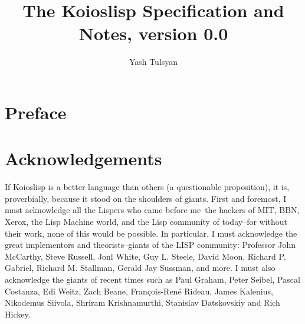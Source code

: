 \documentclass[10pt]{book}
\author{Yash Tulsyan}
\title{The Koioslisp Specification and Notes, version 0.0}
\begin{document}
\maketitle
\tableofcontents
\chapter{Preface}
\chapter{Acknowledgements}
If Koioslisp is a better language than others (a questionable proposition), it is, proverbially, because it stood on the shoulders of giants. First and foremost, I must acknowledge all the Lispers who came before me--the hackers of MIT, BBN, Xerox, the Lisp Machine world, and the Lisp community of today--for without their work, none of this would be possible. In particular, I must acknowledge the great implementors and theorists--giants of the LISP community: Professor John McCarthy, Steve Russell, Jonl White, Guy L. Steele, David Moon, Richard P. Gabriel, Richard M. Stallman, Gerald Jay Sussman, and more. I must also acknowledge the giants of recent times such as Paul Graham, Peter Seibel, Pascal Costanza, Edi Weitz, Zach Beane, Fran\c{c}ois-Ren\'{e} Rideau, James Kalenius, Nikodemus Siivola, Shriram Krishnamurthi, Stanislav Datskovskiy and Rich Hickey.
\end{document}

